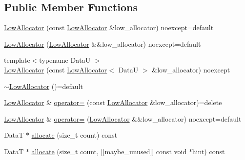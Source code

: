 \subsection*{Public Member Functions}
\begin{DoxyCompactItemize}
\item 
\hyperlink{classmage_1_1_double_ended_memory_stack_1_1_low_allocator_ad2de0c8d250130d5bd9c730f4ff5726c}{Low\+Allocator} (const \hyperlink{classmage_1_1_double_ended_memory_stack_1_1_low_allocator}{Low\+Allocator} \&low\+\_\+allocator) noexcept=default
\item 
\hyperlink{classmage_1_1_double_ended_memory_stack_1_1_low_allocator_ae72c7a214cad73bed8a3503b168ad960}{Low\+Allocator} (\hyperlink{classmage_1_1_double_ended_memory_stack_1_1_low_allocator}{Low\+Allocator} \&\&low\+\_\+allocator) noexcept=default
\item 
{\footnotesize template$<$typename DataU $>$ }\\\hyperlink{classmage_1_1_double_ended_memory_stack_1_1_low_allocator_a1faf25bcb1999a1f1f31dd0a9a32512e}{Low\+Allocator} (const \hyperlink{classmage_1_1_double_ended_memory_stack_1_1_low_allocator}{Low\+Allocator}$<$ DataU $>$ \&low\+\_\+allocator) noexcept
\item 
\hyperlink{classmage_1_1_double_ended_memory_stack_1_1_low_allocator_a27347818f8babe64abc64db773f655c0}{$\sim$\+Low\+Allocator} ()=default
\item 
\hyperlink{classmage_1_1_double_ended_memory_stack_1_1_low_allocator}{Low\+Allocator} \& \hyperlink{classmage_1_1_double_ended_memory_stack_1_1_low_allocator_a0b981bfb43cb094ba5d2bc02fcbcf2f5}{operator=} (const \hyperlink{classmage_1_1_double_ended_memory_stack_1_1_low_allocator}{Low\+Allocator} \&low\+\_\+allocator)=delete
\item 
\hyperlink{classmage_1_1_double_ended_memory_stack_1_1_low_allocator}{Low\+Allocator} \& \hyperlink{classmage_1_1_double_ended_memory_stack_1_1_low_allocator_ab38a1abc19a31fdb8b62119d67749fa0}{operator=} (\hyperlink{classmage_1_1_double_ended_memory_stack_1_1_low_allocator}{Low\+Allocator} \&\&low\+\_\+allocator) noexcept=default
\item 
DataT $\ast$ \hyperlink{classmage_1_1_double_ended_memory_stack_1_1_low_allocator_a447a18b6db5720cac0f8ffcf09eb7446}{allocate} (size\+\_\+t count) const
\item 
DataT $\ast$ \hyperlink{classmage_1_1_double_ended_memory_stack_1_1_low_allocator_a133b158afcb0682c6c808543527dad69}{allocate} (size\+\_\+t count, \mbox{[}\mbox{[}maybe\+\_\+unused\mbox{]}\mbox{]} const void $\ast$hint) const

\end{DoxyCompactItemize}
